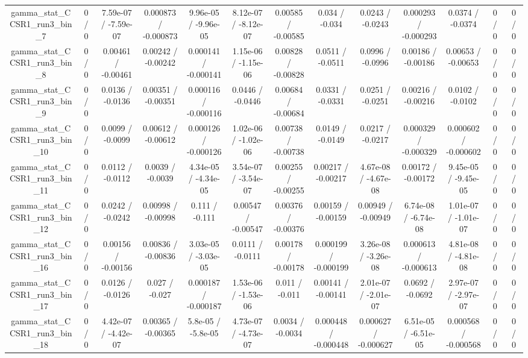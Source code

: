 \documentclass[10pt]{article}
\begin{document}
\begin{table}[htbp]
\begin{center}
\begin{tabular}{|c|c|c|c|c|c|c|c|c|c|c|c|c|}
  gamma_stat_CCSR1_run3_bin_7 & 0 / 0 & 7.59e-07 / -7.59e-07 & 0.000873 / -0.000873 & 9.96e-05 / -9.96e-05 & 8.12e-07 / -8.12e-07 & 0.00585 / -0.00585 & 0.034 / -0.034 & 0.0243 / -0.0243 & 0.000293 / -0.000293 & 0.0374 / -0.0374 & 0 / 0 & 0 / 0 \\ 
  gamma_stat_CCSR1_run3_bin_8 & 0 / 0 & 0.00461 / -0.00461 & 0.00242 / -0.00242 & 0.000141 / -0.000141 & 1.15e-06 / -1.15e-06 & 0.00828 / -0.00828 & 0.0511 / -0.0511 & 0.0996 / -0.0996 & 0.00186 / -0.00186 & 0.00653 / -0.00653 & 0 / 0 & 0 / 0 \\ 
  gamma_stat_CCSR1_run3_bin_9 & 0 / 0 & 0.0136 / -0.0136 & 0.00351 / -0.00351 & 0.000116 / -0.000116 & 0.0446 / -0.0446 & 0.00684 / -0.00684 & 0.0331 / -0.0331 & 0.0251 / -0.0251 & 0.00216 / -0.00216 & 0.0102 / -0.0102 & 0 / 0 & 0 / 0 \\ 
  gamma_stat_CCSR1_run3_bin_10 & 0 / 0 & 0.0099 / -0.0099 & 0.00612 / -0.00612 & 0.000126 / -0.000126 & 1.02e-06 / -1.02e-06 & 0.00738 / -0.00738 & 0.0149 / -0.0149 & 0.0217 / -0.0217 & 0.000329 / -0.000329 & 0.000602 / -0.000602 & 0 / 0 & 0 / 0 \\ 
  gamma_stat_CCSR1_run3_bin_11 & 0 / 0 & 0.0112 / -0.0112 & 0.0039 / -0.0039 & 4.34e-05 / -4.34e-05 & 3.54e-07 / -3.54e-07 & 0.00255 / -0.00255 & 0.00217 / -0.00217 & 4.67e-08 / -4.67e-08 & 0.00172 / -0.00172 & 9.45e-05 / -9.45e-05 & 0 / 0 & 0 / 0 \\ 
  gamma_stat_CCSR1_run3_bin_12 & 0 / 0 & 0.0242 / -0.0242 & 0.00998 / -0.00998 & 0.111 / -0.111 & 0.00547 / -0.00547 & 0.00376 / -0.00376 & 0.00159 / -0.00159 & 0.00949 / -0.00949 & 6.74e-08 / -6.74e-08 & 1.01e-07 / -1.01e-07 & 0 / 0 & 0 / 0 \\ 
  gamma_stat_CCSR1_run3_bin_16 & 0 / 0 & 0.00156 / -0.00156 & 0.00836 / -0.00836 & 3.03e-05 / -3.03e-05 & 0.0111 / -0.0111 & 0.00178 / -0.00178 & 0.000199 / -0.000199 & 3.26e-08 / -3.26e-08 & 0.000613 / -0.000613 & 4.81e-08 / -4.81e-08 & 0 / 0 & 0 / 0 \\ 
  gamma_stat_CCSR1_run3_bin_17 & 0 / 0 & 0.0126 / -0.0126 & 0.027 / -0.027 & 0.000187 / -0.000187 & 1.53e-06 / -1.53e-06 & 0.011 / -0.011 & 0.00141 / -0.00141 & 2.01e-07 / -2.01e-07 & 0.0692 / -0.0692 & 2.97e-07 / -2.97e-07 & 0 / 0 & 0 / 0 \\ 
  gamma_stat_CCSR1_run3_bin_18 & 0 / 0 & 4.42e-07 / -4.42e-07 & 0.00365 / -0.00365 & 5.8e-05 / -5.8e-05 & 4.73e-07 / -4.73e-07 & 0.0034 / -0.0034 & 0.000448 / -0.000448 & 0.000627 / -0.000627 & 6.51e-05 / -6.51e-05 & 0.000568 / -0.000568 & 0 / 0 & 0 / 0 \\ 

\end{tabular}
\end{center}
\end{table}
\end{document}
